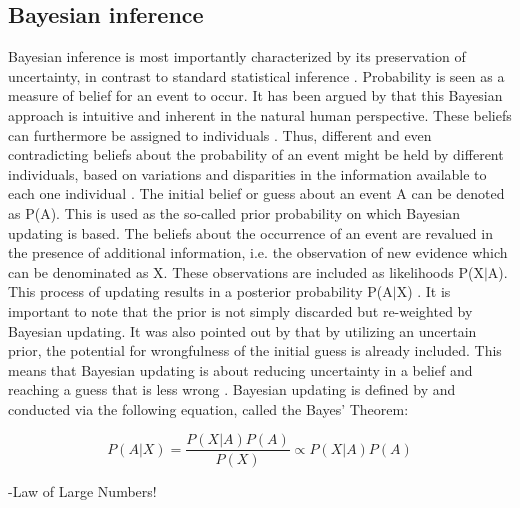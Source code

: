        \subsection{Bayesian inference}
        Bayesian inference is most importantly characterized by its preservation of uncertainty, in contrast to standard statistical inference \cite{davidson2015}. Probability is seen as a measure of belief for an event to occur. It has been argued by \cite{davidson2015}  that this Bayesian approach is intuitive and inherent in the natural human perspective. These beliefs can furthermore be assigned to individuals \cite{davidson2015}. Thus, different and even contradicting beliefs about the probability of an event might be held by different individuals, based on variations and disparities in the information available to each one individual \cite{davidson2015}.
        The initial belief or guess about an event A can be denoted as P(A). This is used as the so-called prior probability on which Bayesian updating is based. The beliefs about the occurrence of an event are revalued in the presence of additional information, i.e. the observation of new evidence which can be denominated as X. These observations are included as likelihoods P(X$|$A). This process of updating results in a posterior probability P(A$|$X) \cite{davidson2015}. It is important to note that the prior is not simply discarded but re-weighted by Bayesian updating. It was also pointed out by \cite{davidson2015} that by utilizing an uncertain prior, the potential for wrongfulness of the initial guess is already included. This means that Bayesian updating is about reducing uncertainty in a belief and reaching a guess that is less wrong \cite{davidson2015}.
        Bayesian updating is defined by and conducted via the following equation, called the Bayes' Theorem:
        
        \begin{equation}\label{eq:BayesTheorem}
        P(A|X) = \frac{P(X|A)P(A)}{P(X)}
        \propto P(X|A)P(A)
        \end{equation}
        
        -Law of Large Numbers!
               
